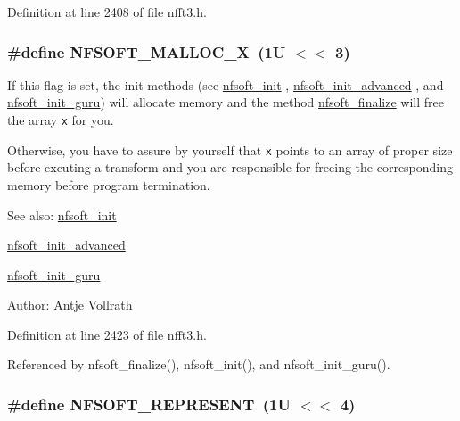 Definition at line 2408 of file nfft3.h.\hypertarget{group__nfsoft_gbe0d04599c1b06144e9a66fc2ac7b09d}{
\subsubsection{\setlength{\rightskip}{0pt plus 5cm}\#define NFSOFT\_\-MALLOC\_\-X~(1U $<$$<$ 3)}}
\label{group__nfsoft_gbe0d04599c1b06144e9a66fc2ac7b09d}


If this flag is set, the init methods (see \hyperlink{group__nfsoft_g31c884458165fa204073c6c16c10775e}{nfsoft\_\-init} , \hyperlink{group__nfsoft_gf4aec4ee2a2a5d56ca27c4f1a7f90b18}{nfsoft\_\-init\_\-advanced} , and \hyperlink{group__nfsoft_g1c13cdd3f82f48fa41acdd313cdc2052}{nfsoft\_\-init\_\-guru}) will allocate memory and the method \hyperlink{group__nfsoft_g30b5c6ae1ff496680f11ddcaad2d5a47}{nfsoft\_\-finalize} will free the array {\tt x} for you. 

Otherwise, you have to assure by yourself that {\tt x} points to an array of proper size before excuting a transform and you are responsible for freeing the corresponding memory before program termination.

\begin{Desc}
\item[See also:]\hyperlink{group__nfsoft_g31c884458165fa204073c6c16c10775e}{nfsoft\_\-init} 

\hyperlink{group__nfsoft_gf4aec4ee2a2a5d56ca27c4f1a7f90b18}{nfsoft\_\-init\_\-advanced} 

\hyperlink{group__nfsoft_g1c13cdd3f82f48fa41acdd313cdc2052}{nfsoft\_\-init\_\-guru} \end{Desc}
\begin{Desc}
\item[Author:]Antje Vollrath \end{Desc}


Definition at line 2423 of file nfft3.h.

Referenced by nfsoft\_\-finalize(), nfsoft\_\-init(), and nfsoft\_\-init\_\-guru().\hypertarget{group__nfsoft_g379d5bf88e399cf492d86090ce47d47d}{
\subsubsection{\setlength{\rightskip}{0pt plus 5cm}\#define NFSOFT\_\-REPRESENT~(1U $<$$<$ 4)}}
\label{group__nfsoft_g379d5bf88e399cf492d86090ce47d47d}


